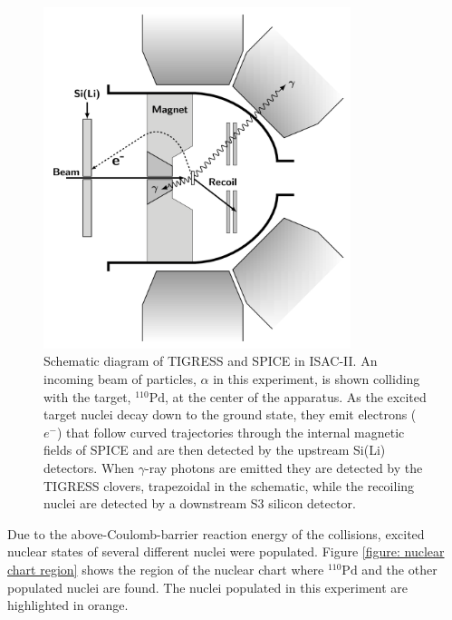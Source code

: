 \begin{figure}[!ht]
  \centering
  \includegraphics[width=0.8\textwidth]{techniques_spice_schematic.png}
  \caption[Schematic diagram of the experimental apparatus used in the June 2016 $\alpha$ particle scattering experiment at TRIUMF's ISAC-II facility.]{Schematic diagram of TIGRESS and SPICE in ISAC-II. An incoming beam of particles, $\alpha$ in this experiment, is shown colliding with the target, $^{110}\mathrm{Pd}$, at the center of the apparatus. As the excited target nuclei decay down to the ground state, they emit electrons ($e^-$) that follow curved trajectories through the internal magnetic fields of SPICE and are then detected by the upstream Si(Li) detectors. When $\gamma$-ray photons are emitted they are detected by the TIGRESS clovers, trapezoidal in the schematic, while the recoiling nuclei are detected by a downstream S3 silicon detector.}
  \label{figure: TIGRESS and SPICE schematic}
\end{figure}

Due to the above-Coulomb-barrier reaction energy of the collisions, excited nuclear states of several different nuclei were populated. Figure \ref{figure: nuclear chart region} shows the region of the nuclear chart where $^{110}\mathrm{Pd}$ and the other populated nuclei are found. The nuclei populated in this experiment are highlighted in orange.

